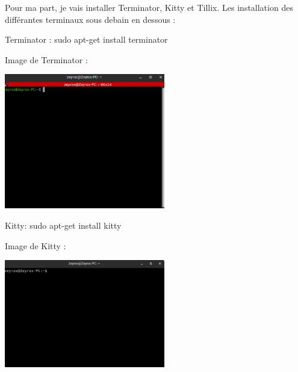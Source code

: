 \documentclass[12pt]{article}
\begin{document}
Pour ma part, je vais installer Terminator, Kitty et Tillix. Les installation des différantes terminaux sous debain en dessous :

\vspace{0.3cm}

Terminator : sudo apt-get install terminator

\vspace{0.3cm}

Image de Terminator : 

\vspace{0.3cm}

\begin{center}
  \includegraphics[width=7cm]{Image-TD-9/terminator.png}
\end{center}

\vspace{0.3cm}

Kitty: sudo apt-get install kitty

\vspace{0.3cm}

Image de Kitty : 

\vspace{0.3cm}

\begin{center}
  \includegraphics[width=7cm]{Image-TD-9/Kitty.png}
\end{center}

\newpage

\vspace{0.3cm}
\end{document}
